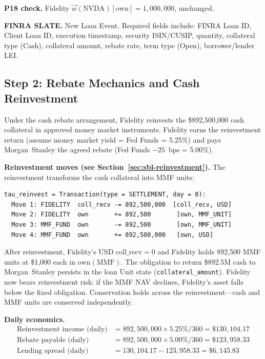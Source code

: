 \documentclass[11pt,a4paper]{article}
\begin{document}
\noindent\textbf{P18 check.} Fidelity $\vec{w}(\text{NVDA})[\mathrm{own}] = 1{,}000{,}000$, unchanged. \checkmark

\noindent\textbf{FINRA SLATE.} New Loan Event. Required fields include: FINRA Loan ID, Client Loan ID, execution timestamp, security ISIN/CUSIP, quantity, collateral type (Cash), collateral amount, rebate rate, term type (Open), borrower/lender LEI.

\subsection{Step 2: Rebate Mechanics and Cash Reinvestment}
\label{sec:us-step2}

Under the cash rebate arrangement, Fidelity reinvests the \$892{,}500{,}000 cash collateral in approved money market instruments. Fidelity earns the reinvestment return (assume money market yield = Fed Funds = 5.25\%) and pays Morgan~Stanley the agreed rebate (Fed Funds $- 25$~bps = 5.00\%).

\medskip
\noindent\textbf{Reinvestment moves (see Section~\ref{sec:sbl-reinvestment}).} The reinvestment transforms the cash collateral into MMF units:

\begin{lstlisting}
tau_reinvest = Transaction(type = SETTLEMENT, day = 0):
  Move 1: FIDELITY  coll_recv -= 892,500,000  [coll_recv, USD]
  Move 2: FIDELITY  own       += 892,500       [own, MMF_UNIT]
  Move 3: MMF_FUND  own       -= 892,500       [own, MMF_UNIT]
  Move 4: MMF_FUND  own       += 892,500,000   [own, USD]
\end{lstlisting}

\noindent After reinvestment, Fidelity's USD $\mathrm{coll\_recv} = 0$ and Fidelity holds 892{,}500 MMF units at \$1{,}000 each in $\mathrm{own}(\text{MMF})$. The obligation to return \$892.5M cash to Morgan~Stanley persists in the loan Unit state (\texttt{collateral\_amount}). Fidelity now bears reinvestment risk: if the MMF NAV declines, Fidelity's asset falls below the fixed obligation. Conservation holds across the reinvestment---cash and MMF units are conserved independently.

\medskip
\noindent\textbf{Daily economics.}
\begin{align*}
\text{Reinvestment income (daily)} &= 892{,}500{,}000 \times 5.25\% / 360 = \$130{,}104.17 \\
\text{Rebate payable (daily)} &= 892{,}500{,}000 \times 5.00\% / 360 = \$123{,}958.33 \\
\text{Lending spread (daily)} &= 130{,}104.17 - 123{,}958.33 = \$6{,}145.83
\end{align*}
\end{document}
